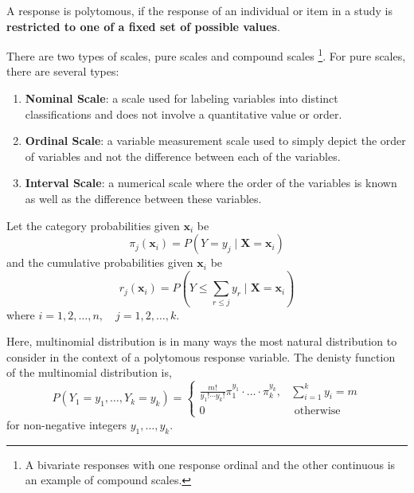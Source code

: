 \begin{definition}
	A response is polytomous, if the response of an individual or item in a study is \textbf{restricted to one of a fixed set of possible values}.
\end{definition}

\begin{remark}
	There are two types of scales, pure scales and compound scales \footnote{A bivariate responses with one response ordinal and the other continuous is an example of compound scales.}. For pure scales, there are several types:
	\begin{enumerate}
		\item \textbf{Nominal Scale}: a scale used for labeling variables into distinct classifications and does not involve a quantitative value or order.
		\item \textbf{Ordinal Scale}: a variable measurement scale used to simply depict the order of variables and not the difference between each of the variables.
		\item \textbf{Interval Scale}: a numerical scale where the order of the variables is known as well as the difference between these variables.
	\end{enumerate}
\end{remark}

Let the category probabilities given $\mathbf{x}_{i}$ be
\begin{equation}
	\pi_{j}\left(\mathbf{x}_{i}\right)=P\left(Y=y_{j}\mid\mathbf{X}=\mathbf{x}_{i}\right)
\end{equation}
and the cumulative probabilities given $\mathbf{x}_{i}$ be
\begin{equation}
	r_{j}\left(\mathbf{x}_{i}\right)=P\left(Y\leq\sum_{r\leq j}y_{r}\mid\mathbf{X}=\mathbf{x}_{i}\right)
\end{equation}
where $i=1,2,\ldots,n,\quad j=1,2,\ldots,k$.

Here, multinomial distribution is in many ways the most natural distribution to consider in the context of a polytomous response variable. The denisty function of the multinomial distribution is,
\begin{equation*}
	P\left(Y_{1}=y_{1},\ldots,Y_{k}=y_{k}\right)=
	\left\{\begin{array}{ll}
		\frac{m!}{y_{1}!\cdots y_{k}!}\pi_{1}^{y_{1}}\cdot\ldots\cdot \pi_{k}^{y_{k}}, & \sum_{i=1}^{k}y_{i}=m \\
		0                                                                              & \text { otherwise }
	\end{array}\right.
\end{equation*}
for non-negative integers $y_{1},\ldots,y_{k}$.

